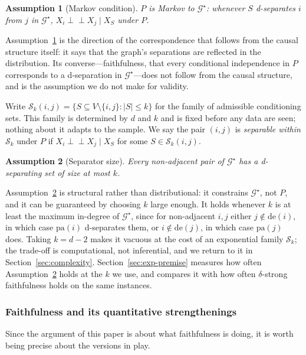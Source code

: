\documentclass[pdflatex,sn-apa]{sn-jnl}
\theoremstyle{thmstyleone}%
\theoremstyle{thmstyletwo}%
\theoremstyle{thmstylethree}%
\newtheorem{assumption}{Assumption}%
\newcommand{\indep}{\perp\!\!\!\perp}
\newcommand{\Scal}{\mathcal{S}}
\newcommand{\Gstar}{\mathcal{G}^{\star}}
\newcommand{\pa}{\mathrm{pa}}
\newcommand{\de}{\mathrm{de}}
\begin{document}
\begin{assumption}[Markov condition]\label{ass:markov}
$P$ is Markov to $\Gstar$: whenever $S$ d-separates $i$ from $j$ in $\Gstar$,
$X_i \indep X_j \mid X_S$ under $P$.
\end{assumption}

Assumption~\ref{ass:markov} is the direction of the correspondence that
follows from the causal structure itself: it says that the graph's separations
are reflected in the distribution. Its converse---faithfulness, that every
conditional independence in $P$ corresponds to a d-separation in
$\Gstar$---does not follow from the causal structure, and is the assumption we
do not make for validity.

Write $\Scal_k(i,j) = \{ S \subseteq V \setminus \{i,j\} : |S| \le k \}$ for
the family of admissible conditioning sets. This family is determined by $d$
and $k$ and is fixed before any data are seen; nothing about it adapts to the
sample. We say the pair $(i,j)$ is \emph{separable within $\Scal_k$} under $P$
if $X_i \indep X_j \mid X_S$ for some $S \in \Scal_k(i,j)$.

\begin{assumption}[Separator size]\label{ass:sep}
Every non-adjacent pair of $\Gstar$ has a d-separating set of size at most
$k$.
\end{assumption}

Assumption~\ref{ass:sep} is structural rather than distributional: it
constrains $\Gstar$, not $P$, and it can be guaranteed by choosing $k$ large
enough. It holds whenever $k$ is at least the maximum in-degree of $\Gstar$,
since for non-adjacent $i,j$ either $j \notin \de(i)$, in which case $\pa(i)$
d-separates them, or $i \notin \de(j)$, in which case $\pa(j)$ does. Taking
$k = d-2$ makes it vacuous at the cost of an exponential family $\Scal_k$; the
trade-off is computational, not inferential, and we return to it in
Section~\ref{sec:complexity}. Section~\ref{sec:exp-premise} measures how often
Assumption~\ref{ass:sep} holds at the $k$ we use, and compares it with how
often $\delta$-strong faithfulness holds on the same instances.

\subsubsection{Faithfulness and its quantitative strengthenings}
\label{sec:faithfulness}

Since the argument of this paper is about what faithfulness is doing, it is
worth being precise about the versions in play.
\end{document}
